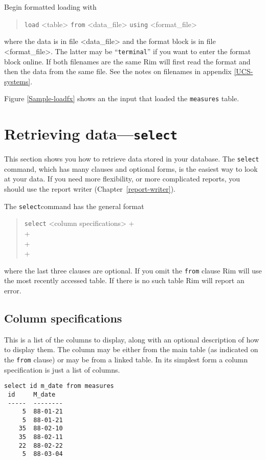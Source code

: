 \documentclass[11pt,a4paper]{report}
\begin{document}
Begin formatted loading with
\begin{verse}
\verb|load| <table> \verb|from| <data\_file> \verb|using| <format\_file>
\end{verse}
where the data is in file <data\_file> and the format block
is in file <format\_file>. The latter may be ``\verb|terminal|''
if you want to enter the format block online.
If both filenames are the same Rim will first read the
format and then the data from the same file.
See the notes on filenames in appendix \ref{UCS-systems}.
 
Figure \ref{Sample-loadfx} shows an the input that loaded
the \verb|measures| table.
 
 
\section{Retrieving data---{\tt select}}
%
This section shows you how to retrieve data stored in
your database.
The \verb|select| command, which has many clauses and optional forms,
is the easiest way to look at your data.
If you need more flexibility, or more complicated reports,
you should use the report writer (Chapter~\ref{report-writer}).

The \verb|select|command has the general format
\begin{verse}
  \verb|select| <column specifications> + \\
  \qquad {} + \\
  \qquad {} + \\
  \qquad {} + \\
  \qquad {}
\end{verse}
where the last three clauses are optional.
If you omit the \verb|from| clause Rim will use the most recently
accessed table.  If there is no such table
Rim will report an error.
 
\subsection{Column specifications}
%
This is a list of the columns to display, along with an optional
description of how to display them.  The column may be either
from the main table (as indicated on the \verb|from| clause) or may
be from a linked table.
In its simplest form a column specification is just a list of columns.
 

\begin{verbatim}
select id m_date from measures
 id     M_date
 -----  --------
     5  88-01-21
     5  88-01-21
    35  88-02-10
    35  88-02-11
    22  88-02-22
     5  88-03-04
\end{verbatim}
 
\end{document}
